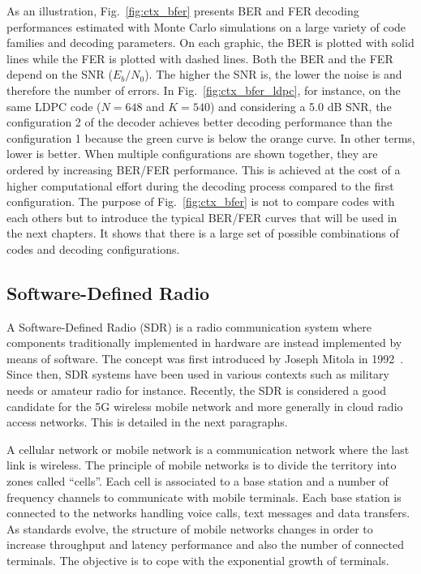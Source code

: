 As an illustration, Fig.~\ref{fig:ctx_bfer} presents BER and FER decoding
performances estimated with Monte Carlo simulations on a large variety of code
families and decoding parameters. On each graphic, the BER is plotted with solid
lines while the FER is plotted with dashed lines. Both the BER and the FER
depend on the SNR ($E_b/N_0$). The higher the SNR is, the lower the noise is and
therefore the number of errors. In Fig.~\ref{fig:ctx_bfer_ldpc}, for instance,
on the same LDPC code ($N = 648$ and $K = 540$) and considering a 5.0 dB SNR,
the configuration 2 of the decoder achieves better decoding performance than the
configuration 1 because the {\color{Paired-3} green} curve is below the
{\color{Paired-7} orange} curve. In other terms, lower is better. When multiple
configurations are shown together, they are ordered by increasing BER/FER
performance. This is achieved at the cost of a higher computational effort
during the decoding process compared to the first configuration. The purpose of
Fig.~\ref{fig:ctx_bfer} is not to compare codes with each others but to
introduce the typical BER/FER curves that will be used in the next chapters. It
shows that there is a large set of possible combinations of codes and decoding
configurations.

\newpage
\subsection{Software-Defined Radio}

A Software-Defined Radio (SDR) is a radio communication system where components
traditionally implemented in hardware are instead implemented by means of
software. The concept was first introduced by Joseph Mitola in
1992~\cite{Mitola1992,Mitola1993}. Since then, SDR systems have been used in
various contexts such as military needs or amateur radio for instance. Recently,
the SDR is considered a good candidate for the 5G wireless mobile network and
more generally in cloud radio access networks. This is detailed in the next
paragraphs.

A cellular network or mobile network is a communication network where the last
link is wireless. The principle of mobile networks is to divide the territory
into zones called ``cells''. Each cell is associated to a base station and a
number of frequency channels to communicate with mobile terminals. Each base
station is connected to the networks handling voice calls, text messages and
data transfers. As standards evolve, the structure of mobile networks changes in
order to increase throughput and latency performance and also the number of
connected terminals. The objective is to cope with the exponential growth of
terminals.

